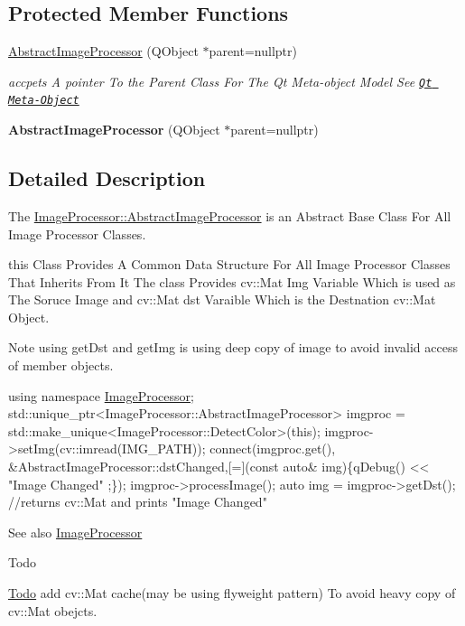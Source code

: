 \subsection*{Protected Member Functions}
\begin{DoxyCompactItemize}
\item 
\hyperlink{class_image_processor_1_1_abstract_image_processor_a5d89a80ba5924d41809a877e4128039a}{Abstract\+Image\+Processor} (Q\+Object $\ast$parent=nullptr)
\begin{DoxyCompactList}\small\item\em accpets A pointer To the Parent Class For The Qt Meta-\/object Model See \href{http://doc.qt.io/qt-5/metaobjects.html}{\tt Qt Meta-\/\+Object} \end{DoxyCompactList}\item 
\mbox{\label{class_image_processor_1_1_abstract_image_processor_afed21785fad3fc501ba80714c5f10c0b}} 
{\bfseries Abstract\+Image\+Processor} (Q\+Object $\ast$parent=nullptr)
\end{DoxyCompactItemize}


\subsection{Detailed Description}
The \hyperlink{class_image_processor_1_1_abstract_image_processor}{Image\+Processor\+::\+Abstract\+Image\+Processor} is an Abstract Base Class For All Image Processor Classes. 

this Class Provides A Common Data Structure For All Image Processor Classes That Inherits From It The class Provides cv\+::\+Mat Img Variable Which is used as The Soruce Image and cv\+::\+Mat dst Varaible Which is the Destnation cv\+::\+Mat Object. \begin{DoxyNote}{Note}
using get\+Dst and get\+Img is using deep copy of image to avoid invalid access of member objects.
\end{DoxyNote}

\begin{DoxyCode}
\textcolor{keyword}{using namespace }\hyperlink{namespace_image_processor}{ImageProcessor};
std::unique\_ptr<ImageProcessor::AbstractImageProcessor> imgproc = 
      std::make\_unique<ImageProcessor::DetectColor>(\textcolor{keyword}{this});
imgproc->setImg(cv::imread(IMG\_PATH));
connect(imgproc.get(), &AbstractImageProcessor::dstChanged,[=](\textcolor{keyword}{const} \textcolor{keyword}{auto}& img)\{qDebug() << \textcolor{stringliteral}{"Image Changed"}
      ;\});
imgproc->processImage();
\textcolor{keyword}{auto} img = imgproc->getDst(); \textcolor{comment}{//returns cv::Mat and prints "Image Changed"}
\end{DoxyCode}
 \begin{DoxySeeAlso}{See also}
\hyperlink{namespace_image_processor}{Image\+Processor} 
\end{DoxySeeAlso}
\begin{DoxyRefDesc}{Todo}
\item[\hyperlink{todo__todo000001}{Todo}]add cv\+::\+Mat cache(may be using flyweight pattern) To avoid heavy copy of cv\+::\+Mat obejcts. \end{DoxyRefDesc}


